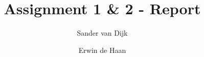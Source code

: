 \documentclass[final]{scrartcl} %
\title{Assignment 1 \& 2 - Report}
\author{Sander {van Dijk} \and Erwin {de Haan}}
\begin{document}
\maketitle

\section{}
\end{document}
